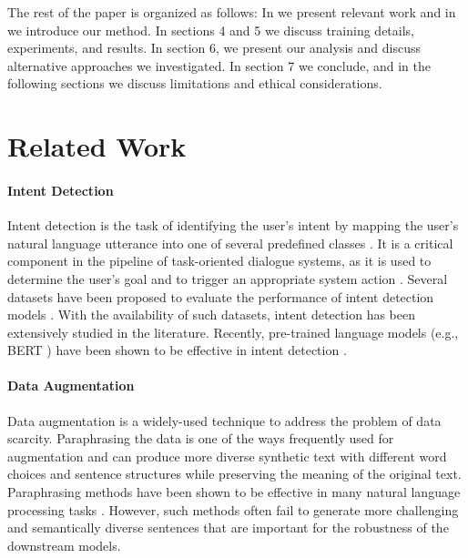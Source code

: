 \documentclass[11pt]{article}
\begin{document}
The rest of the paper is organized as follows: In  we present relevant work and in  we introduce our method. In sections 4 and 5 we discuss training details, experiments, and results. In section 6, we present our analysis and discuss alternative approaches we investigated. In section 7 we conclude, and in the following sections we discuss limitations and ethical considerations.

\section{Related Work}
\label{sec:related_work}
\paragraph{Intent Detection}
Intent detection is the task of identifying the user's intent by mapping the user's natural language utterance into one of several predefined classes \cite{DBLP:conf/naacl/HemphillGD90,DBLP:journals/corr/abs-1805-10190}.
It is a critical component in the pipeline of task-oriented dialogue systems, as it is used to determine the user's goal and to trigger an appropriate system action \cite{DBLP:conf/interspeech/RauxLBBE05,DBLP:journals/pieee/YoungGTW13}.
Several datasets have been proposed to evaluate the performance of intent detection models \cite[for some recent examples]{casanueva-etal-2020-efficient,DBLP:conf/iwsds/LiuESR19,larson-etal-2019-evaluation}. 
With the availability of such datasets, intent detection has been extensively studied in the literature.
Recently, pre-trained language models (e.g., BERT \cite{devlin-etal-2019-bert}) have been shown to be effective in intent detection \cite{DBLP:journals/corr/abs-2004-09936,zhang-etal-2020-discriminative,zhang-etal-2021-effectiveness-pre,zhang-etal-2021-shot,mehri-eric-2021-example}.

\paragraph{Data Augmentation}
Data augmentation is a widely-used technique to address the problem of data scarcity. 
Paraphrasing the data is one of the ways frequently used for augmentation and can produce more diverse synthetic text with different
word choices and sentence structures while preserving the meaning of the original text. Paraphrasing methods have been shown to be effective in many natural language processing tasks \cite{DBLP:conf/aaai/GuptaASR18,edunov-etal-2018-understanding,DBLP:conf/naacl/IyyerWGZ18,wei-zou-2019-eda,cai-etal-2020-data,okur-etal-2022-data,panda-etal-2021-multilingual,jolly-etal-2020-data}.
However, such methods often fail to generate more challenging and semantically diverse sentences that are important for the robustness of the downstream models.
\end{document}
